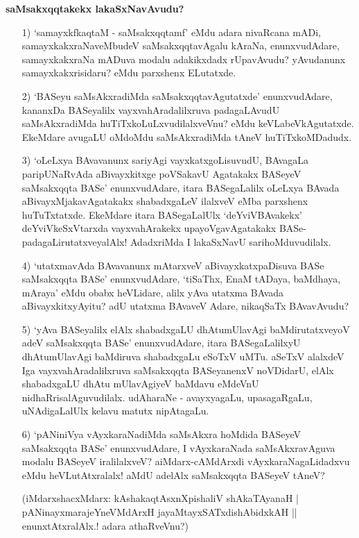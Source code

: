 \bigskip
\noindent
{\large\bf saMsakxqqtakekx lakaSxNavAvudu?}\label{page2}
\smallskip
\begin{itemize}
\item[1)] `samayxkfkaqtaM - saMsakxqqtamf' eMdu adara nivaRcana mADi, samayxkakxraNa\-veMbudeV saMsakxqqta\-vAgalu kAraNa, enunxvudAdare, samayxkakxraNa mADuva modalu adakikxdadx rUpavAvudu? yAvudanunx samayxkakxrisi\-daru? eMdu parxshenx ELutatxde.

\item[2)] `BASeyu saMsAkxradiMda saMsakxqqtavAgutatxde' enunxvudAdare, kananxDa BASe\-yalilx vayxva\-hAra\-dalilx\-ruva pada\-gaLAvudU saMsAkxradiMda huTiTxkoLuLxvu\-dilalxveVnu? eMdu keVLabeVkAgutatxde. EkeM\-dare \-avu\-gaLU oMdoMdu saMsAkxradiMda tAneV huTiTxkoMDadudx.

\item[3)] `oLeLxya BAvavanunx sariyAgi vayxkatxgoLisuvudU, BAvagaLa paripUNaR\-vAda aBivayxkitxge poVSa\-kavU Aga\-takakx BASeyeV saMsakxqqta BASe' enunxvu\-dAdare, itara BASegaLalilx oLeLxya BAvada aBi\-vayxMjaka\-vAga\-takakx shabadxgaLeV ilalxveV eMba parxshenx huTuTxtatxde. EkeMdare itara BASegaLalUlx `deYviVBAvakekx' deYviV\-keSxVtarxda vayxvahArakekx upayoVgavAgatakakx BASe-padagaLirutatxveyalAlx! AdadxriMda I lakaSx\-NavU\- sarihoM\-duvudilalx.



\item[4)] `utatxmavAda BAvavanunx mAtarxveV aBivayxkatxpaDisuva BASe saMsakxqqta BASe' enunxvudAdare, `tiSaThx,\- EnaM tADaya, baMdhaya, mAraya' eMdu obabx heVLidare, alilx yAva utatxma BAvada aBivayxkitx\-yAyitu? adU utatxma BAvaveV Adare, nikaqSaTx BAvavAvudu?

\vfill\eject

\item[5)] `yAva BASeyalilx elAlx shabadxgaLU dhAtumUlavAgi baMdirutatxveyoV adeV saMsakxqqta BASe' enunxvudAdare, itara BASegaLalilxyU dhAtumUla\-vAgi baMdiruva shabadxgaLu eSoTxV uMTu. aSeTxV alalxdeV Iga vayxvahAradalilxruva saMsakxqqta BASeyanenxV noVDidarU, elAlx shabadxgaLU dhAtu mUla\-vAgiyeV baMdavu eMdeVnU nidhaRrisalAguvudilalx. udAharaNe - avayxyagaLu, upasagaRgaLu, uNAdigaLalUlx kelavu matutx nipAtagaLu.

\item[6)] `pANiniVya vAyxkaraNadiMda saMsAkxra hoMdida BASeyeV saMsakxqqta BASe' enunxvudAdare, I vAyxkaraNada saMsAkxravAguva modalu BASeyeV iralilalxveV? aiMdarx-cAMdArxdi vAyxkaraNagaLidadxvu eMdu heVLutAtxralalx! aMdU adelAlx saMsakxqqta BASeyeV tAneV?

\begin{shloka}
(iMdarxshacxMdarx: kAshakaqtAsxnXpishaliV shAkaTAyanaH |\\\label{3}
pANinayxmarajeYneVMdArxH jayaMtayxSATxdishAbidxkAH ||\\
enunxtAtxralAlx.! adara athaRveVnu?)
\end{shloka}
\end{itemize}

